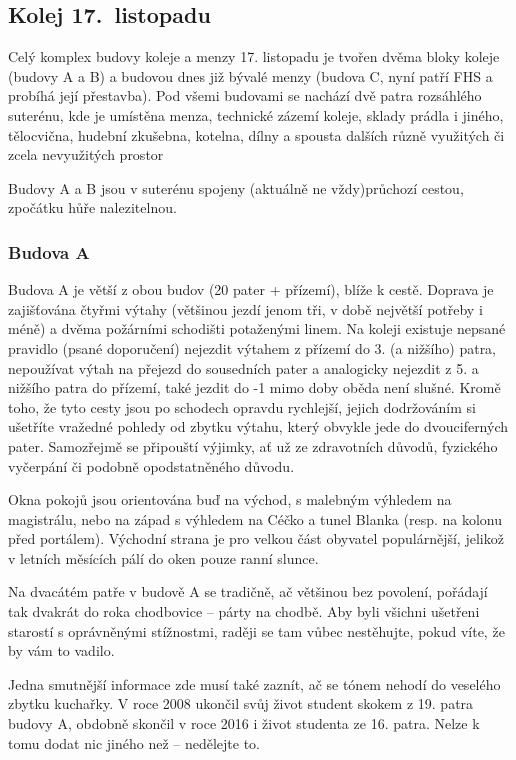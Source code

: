 ﻿\subsection{Kolej 17.~listopadu}

Celý komplex budovy koleje a menzy 17. listopadu je tvořen dvěma bloky koleje (budovy A a B) a budovou dnes již
bývalé menzy (budova C, nyní patří FHS a probíhá její přestavba). Pod všemi
budovami se nachází dvě patra rozsáhlého suterénu, kde je umístěna menza,
technické zázemí koleje, sklady prádla i jiného, tělocvična, hudební zkušebna,
kotelna, dílny a spousta dalších různě využitých či zcela nevyužitých prostor

Budovy A a B jsou v suterénu spojeny (aktuálně ne vždy)průchozí cestou, zpočátku hůře
nalezitelnou. 

\subsubsection{Budova A}
Budova A je větší z obou budov (20 pater + přízemí), blíže k cestě. Doprava je
zajišťována čtyřmi výtahy (většinou jezdí jenom tři, v době největší potřeby i
méně) a dvěma požárními schodišti potaženými linem. Na koleji existuje nepsané pravidlo (psané doporučení)
nejezdit výtahem z přízemí do 3. (a nižšího) patra, nepoužívat výtah na přejezd
do sousedních pater a analogicky nejezdit z 5. a nižšího patra do přízemí, také
jezdit do -1 mimo doby oběda není slušné. Kromě toho, že tyto cesty jsou po
schodech opravdu rychlejší, jejich dodržováním si ušetříte vražedné pohledy od
zbytku výtahu, který obvykle jede do dvouciferných pater. Samozřejmě se
připouští výjimky, ať už ze zdravotních důvodů, fyzického vyčerpání či podobně
opodstatněného důvodu.

Okna pokojů jsou orientována buď na východ, s malebným výhledem na magistrálu,
nebo na západ s výhledem na Céčko a tunel Blanka (resp. na kolonu před
portálem). Východní strana je pro velkou část obyvatel populárnější, jelikož v
letních měsících pálí do oken pouze ranní slunce.

Na dvacátém patře v budově A se tradičně, ač většinou bez
povolení, pořádají tak dvakrát do roka chodbovice – párty na chodbě. Aby byli
všichni ušetřeni starostí s oprávněnými stížnostmi, raději se tam vůbec
nestěhujte, pokud víte, že by vám to vadilo.

Jedna smutnější informace zde musí také zaznít, ač se tónem nehodí do veselého
zbytku kuchařky. V roce 2008 ukončil svůj život student skokem z 19. patra
budovy A, obdobně skončil v roce 2016 i život studenta ze 16. patra. Nelze k
tomu dodat nic jiného než – nedělejte to.


